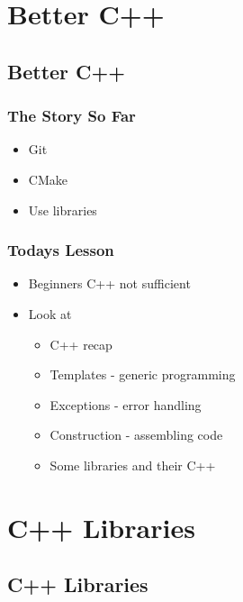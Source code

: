 \section{Better C++}\label{better-c}

\subsection{Better C++}\label{better-c-1}

\subsubsection{The Story So Far}\label{the-story-so-far}

\begin{itemize}
\itemsep1pt\parskip0pt
\item
  Git
\item
  CMake
\item
  Use libraries
\end{itemize}

\subsubsection{Todays Lesson}\label{todays-lesson-1}

\begin{itemize}
\itemsep1pt\parskip0pt
\item
  Beginners C++ not sufficient
\item
  Look at

  \begin{itemize}
  \itemsep1pt\parskip0pt
  \item
    C++ recap
  \item
    Templates - generic programming
  \item
    Exceptions - error handling
  \item
    Construction - assembling code
  \item
    Some libraries and their C++
  \end{itemize}
\end{itemize}

\section{C++ Libraries}\label{c-libraries}

\subsection{C++ Libraries}\label{c-libraries-1}

